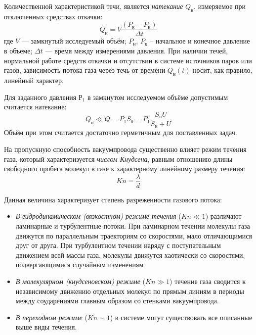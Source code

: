 \documentclass[a4paper,12pt]{article}
\theoremstyle{plain} %
\theoremstyle{definition} %
\theoremstyle{remark} %
\begin{document}
Количественной характеристикой течи, является \textit{натекание }$Q_\text{н}$, измеряемое при отключенных средствах откачки:
\begin{equation}
Q_\text{н} = V\frac{(P_\text{к}-P_\text{н})}{\Delta t}
\end{equation}
где $V$ — замкнутый исследуемый объём; $P_\text{н}$, $P_\text{к}$ -- начальное и конечное давление в объеме; $\Delta t$ — время между измерениями давления. При наличии течей, нормальной работе средств откачки и отсутствии в системе источников паров или газов, зависимость потока газа через течь от времени $Q_\text{н}(t)$ носит, как правило, линейный характер.

Для заданного давления $Р_1$ в замкнутом исследуемом объёме допустимым считается натекание:
\begin{equation}
Q_\text{н} \ll Q = P_1S_0 = P_1\frac{S_\text{н}U}{S_\text{н}+U}
\end{equation}
Объём при этом считается достаточно герметичным для поставленных задач.

На пропускную способность вакуумпровода существенно влияет режим течения газа, который характеризуется \textit{числом Кнудсена}, равным отношению длины свободного пробега молекул в газе к характерному линейному размеру течения:
\begin{equation}
Kn = \frac{\lambda}{d}
\end{equation}

Данная величина характеризует степень разреженности газового
потока:
\begin{itemize}
	\item\textit{В гидродинамическом (вязкостном) режиме течения} ($Kn \ll 1$) различают ламинарные и турбулентные потоки. При ламинарном течении молекулы газа движутся по параллельным траекториям со скоростями, мало отличающимися друг от друга. При турбулентном течении наряду с поступательным движением всей массы газа, молекулы движутся хаотически со скоростями, подвергающимися случайным изменениям
	\item \textit{В молекулярном (кнудсеновском) режиме} ($Kn \gg 1$) течение газа сводится к независимому движению отдельных молекул по прямым линиям в периоды между соударениями главным образом со стенками вакуумпровода.
	\item \textit{В переходном режиме} ($Kn\sim 1$) в системе могут существовать все описанные выше виды течения.
\end{itemize}
\end{document}
